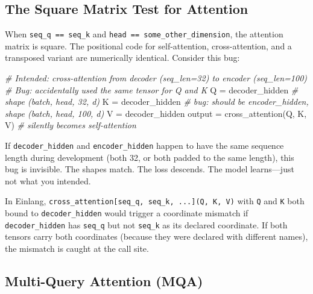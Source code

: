 \documentclass[11pt,titlepage]{article}
\newenvironment{Shaded}{}{}
\newcommand{\CommentTok}[1]{\textcolor[rgb]{0.38,0.63,0.69}{\textit{#1}}}
\newcommand{\NormalTok}[1]{#1}
\newcommand{\OperatorTok}[1]{\textcolor[rgb]{0.40,0.40,0.40}{#1}}
\begin{document}
\hypertarget{the-square-matrix-test-for-attention}{%
\subsection{The Square Matrix Test for
Attention}\label{the-square-matrix-test-for-attention}}

When \texttt{seq\_q\ ==\ seq\_k} and
\texttt{head\ ==\ some\_other\_dimension}, the attention matrix is
square. The positional code for self-attention, cross-attention, and a
transposed variant are numerically identical. Consider this bug:

\begin{Shaded}
\begin{Highlighting}[]
\CommentTok{# Intended: cross-attention from decoder (seq_len=32) to encoder (seq_len=100)}
\CommentTok{# Bug: accidentally used the same tensor for Q and K}
\NormalTok{Q }\OperatorTok{=}\NormalTok{ decoder_hidden   }\CommentTok{# shape (batch, head, 32, d)}
\NormalTok{K }\OperatorTok{=}\NormalTok{ decoder_hidden   }\CommentTok{# bug: should be encoder_hidden, shape (batch, head, 100, d)}
\NormalTok{V }\OperatorTok{=}\NormalTok{ decoder_hidden}
\NormalTok{output }\OperatorTok{=}\NormalTok{ cross_attention(Q, K, V)  }\CommentTok{# silently becomes self-attention}
\end{Highlighting}
\end{Shaded}

If \texttt{decoder\_hidden} and \texttt{encoder\_hidden} happen to have
the same sequence length during development (both 32, or both padded to
the same length), this bug is invisible. The shapes match. The loss
descends. The model learns---just not what you intended.

In Einlang,
\texttt{cross\_attention{[}seq\_q,\ seq\_k,\ ...{]}(Q,\ K,\ V)} with
\texttt{Q} and \texttt{K} both bound to \texttt{decoder\_hidden} would
trigger a coordinate mismatch if \texttt{decoder\_hidden} has
\texttt{seq\_q} but not \texttt{seq\_k} as its declared coordinate. If
both tensors carry both coordinates (because they were declared with
different names), the mismatch is caught at the call site.

\vspace{2em}

\hypertarget{multi-query-attention-mqa}{%
\subsection{Multi-Query Attention
(MQA)}\label{multi-query-attention-mqa}}
\end{document}
